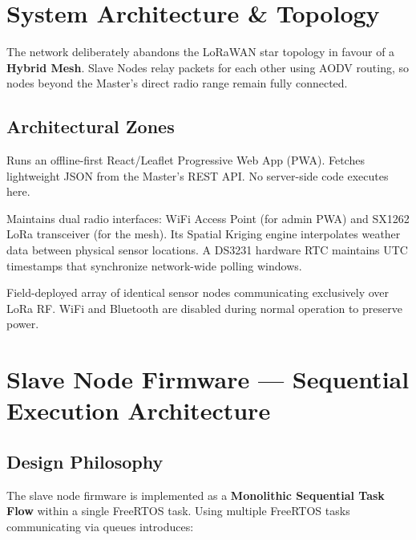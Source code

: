\documentclass[12pt,a4paper]{article}
\begin{document}
\section{System Architecture \& Topology}

The network deliberately abandons the LoRaWAN star topology in favour of a \textbf{Hybrid Mesh}. Slave Nodes relay packets for each other using AODV routing, so nodes beyond the Master's direct radio range remain fully connected.

\subsection{Architectural Zones}

\begin{description}[leftmargin=2em]
    \item[Zone 1 --- Admin Client Device:] Runs an offline-first React/Leaflet Progressive Web App (PWA). Fetches lightweight JSON from the Master's REST API. No server-side code executes here.
    \item[Zone 2 --- Master Node (ESP32-S3-N16R8):] Maintains dual radio interfaces: WiFi Access Point (for admin PWA) and SX1262 LoRa transceiver (for the mesh). Its Spatial Kriging engine interpolates weather data between physical sensor locations. A DS3231 hardware RTC maintains UTC timestamps that synchronize network-wide polling windows.
    \item[Zone 3 --- Slave Mesh:] Field-deployed array of identical sensor nodes communicating exclusively over LoRa RF. WiFi and Bluetooth are disabled during normal operation to preserve power.
\end{description}

\section{Slave Node Firmware --- Sequential Execution Architecture}

\subsection{Design Philosophy}

The slave node firmware is implemented as a \textbf{Monolithic Sequential Task Flow} within a single FreeRTOS task. Using multiple FreeRTOS tasks communicating via queues introduces:
\end{document}
